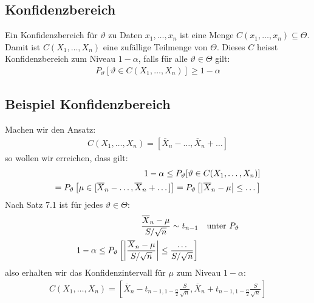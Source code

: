 \documentclass[8pt]{extarticle}
\newcommand{\vt}{\vartheta}
\newcommand{\zufallsvariablen}{X_1, \dots, X_n}
\begin{document}
\begin{multicols*}{3}
  \subsection*{Konfidenzbereich}
  Ein Konfidenzbereich für $\vt$ zu Daten $x_1, \dots, x_n$ ist eine
  Menge $C(x_1, \dots, x_n) \subseteq \varTheta$. Damit ist
  $C(\zufallsvariablen)$ eine zufällige Teilmenge von $\varTheta$. Dieses
  $C$ heisst Konfidenzbereich zum Niveau $1 - \alpha$, falls für alle
  $\vt \in \varTheta$ gilt:
  \begin{align*}
    P_\vt [\vt \in C(\zufallsvariablen)] \geq 1 - \alpha
  \end{align*}
  \subsection*{Beispiel Konfidenzbereich}
  Machen wir den Ansatz:
  \begin{align*}
    C(\zufallsvariablen) = [\overline{X}_n - \dots, \overline{X}_n + \dots]
  \end{align*}
  so wollen wir erreichen, dass gilt:
  \begin{align*}
    1 - \alpha \leq P_\vt[\vt \in  C(\zufallsvariablen)] \\
    = P_\vt \left[ \mu \in [\overline{X}_n - \dots, \overline{X}_n + \dots] \right]
    = P_\vt \left[ \abs{\overline{X}_n - \mu} \leq \dots \right]
  \end{align*}
  Nach Satz 7.1 ist für jedes $\vt \in \varTheta$:
  \begin{align*}
    \frac{\overline{X}_n - \mu}{S / \sqrt{n}} \sim t_{n-1} &  & \text{unter } P_\vt \\
    1 - \alpha \leq P_\vt \left[ \abs{\frac{\overline{X}_n - \mu}{S / \sqrt{n}}} \leq \frac{\dots}{S / \sqrt{n}} \right]
  \end{align*}
  also erhalten wir das Konfidenzintervall für $\mu$ zum Niveau $1 - \alpha$:
  \begin{align*}
    C(\zufallsvariablen) = \left[ \overline{X}_n - t_{n-1, 1 - \frac{\alpha}{2}} \frac{S}{\sqrt{n}}, \overline{X}_n + t_{n-1, 1 - \frac{\alpha}{2}} \frac{S}{\sqrt{n}} \right]
  \end{align*}









\end{multicols*}
\end{document}
